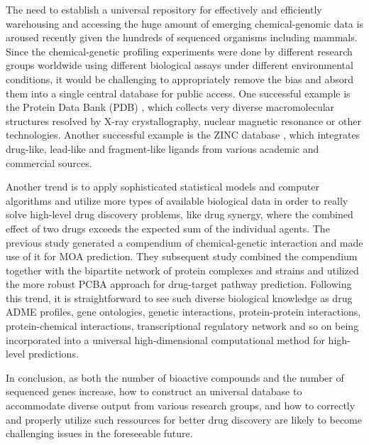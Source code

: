 \documentclass[12pt,fullpage,singlespace]{article}
\begin{document}
The need to establish a universal repository for effectively and efficiently warehousing and accessing the huge amount of emerging chemical-genomic data is aroused recently given the hundreds of sequenced organisms including mammals. Since the chemical-genetic profiling experiments were done by different research groups worldwide using different biological assays under different environmental conditions, it would be challenging to appropriately remove the bias and absord them into a single central database for public access. One successful example is the Protein Data Bank (PDB) \citep{105}, which collects very diverse macromolecular structures resolved by X-ray crystallography, nuclear magnetic resonance or other technologies. Another successful example is the ZINC database \citep{532}, which integrates drug-like, lead-like and fragment-like ligands from various academic and commercial sources.

Another trend is to apply sophisticated statistical models and computer algorithms and utilize more types of available biological data in order to really solve high-level drug discovery problems, like drug synergy, where the combined effect of two drugs exceeds the expected sum of the individual agents. The previous study \citep{1078}  generated a compendium of chemical-genetic interaction and made use of it for MOA prediction. They subsequent study \citep{1079} combined the compendium together with the bipartite network of protein complexes and strains and utilized the more robust PCBA approach for drug-target pathway prediction. Following this trend, it is straightforward to see such diverse biological knowledge as drug ADME profiles, gene ontologies, genetic interactions, protein-protein interactions, protein-chemical interactions, transcriptional regulatory network and so on being incorporated into a universal high-dimensional computational method for high-level predictions.

In conclusion, as both the number of bioactive compounds and the number of sequenced genes increase, how to construct an universal database to accommodate diverse output from various research groups, and how to correctly and properly utilize such ressources for better drug discovery are likely to become challenging issues in the foreseeable future.



\end{document}

